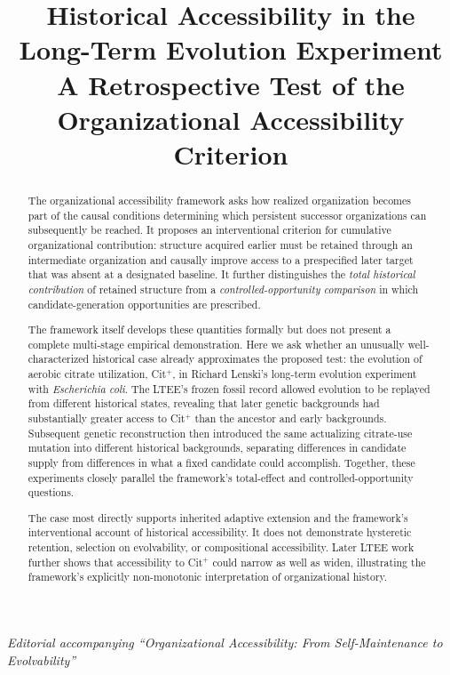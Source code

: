 \documentclass[11pt]{article}
\title{\textbf{Historical Accessibility in the Long-Term Evolution Experiment}\\[0.4em]
\large A Retrospective Test of the Organizational Accessibility Criterion}
\author{}
\date{}
\begin{document}
\maketitle

\begin{center}
\emph{Editorial accompanying ``Organizational Accessibility: From Self-Maintenance to Evolvability''}
\end{center}

\begin{abstract}
The organizational accessibility framework asks how realized organization becomes part of the causal conditions determining which persistent successor organizations can subsequently be reached. It proposes an interventional criterion for cumulative organizational contribution: structure acquired earlier must be retained through an intermediate organization and causally improve access to a prespecified later target that was absent at a designated baseline. It further distinguishes the \emph{total historical contribution} of retained structure from a \emph{controlled-opportunity comparison} in which candidate-generation opportunities are prescribed.

The framework itself develops these quantities formally but does not present a complete multi-stage empirical demonstration. Here we ask whether an unusually well-characterized historical case already approximates the proposed test: the evolution of aerobic citrate utilization, Cit$^{+}$, in Richard Lenski's long-term evolution experiment with \emph{Escherichia coli}. The LTEE's frozen fossil record allowed evolution to be replayed from different historical states, revealing that later genetic backgrounds had substantially greater access to Cit$^{+}$ than the ancestor and early backgrounds. Subsequent genetic reconstruction then introduced the same actualizing citrate-use mutation into different historical backgrounds, separating differences in candidate supply from differences in what a fixed candidate could accomplish. Together, these experiments closely parallel the framework's total-effect and controlled-opportunity questions.

The case most directly supports inherited adaptive extension and the framework's interventional account of historical accessibility. It does not demonstrate hysteretic retention, selection on evolvability, or compositional accessibility. Later LTEE work further shows that accessibility to Cit$^{+}$ could narrow as well as widen, illustrating the framework's explicitly non-monotonic interpretation of organizational history.
\end{abstract}
\end{document}
